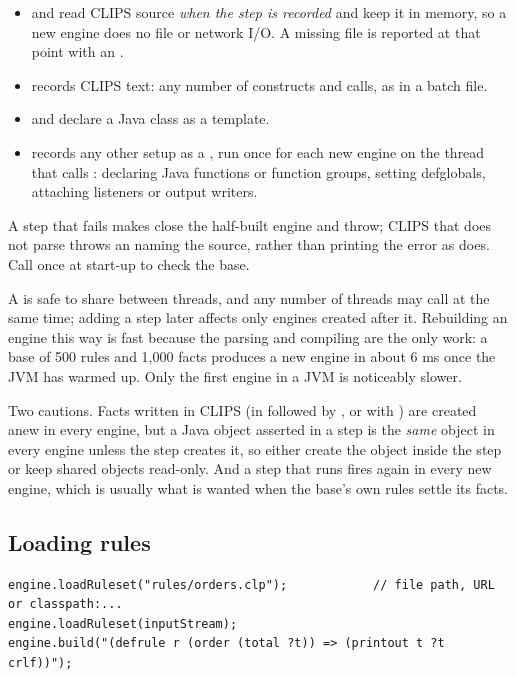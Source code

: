 \begin{itemize}
\item {} and  read CLIPS source
  \emph{when the step is recorded} and keep it in memory, so a new
  engine does no file or network I/O. A missing file is reported at that
  point with an .
\item {} records CLIPS text: any number of constructs and
  calls, as in a batch file.
\item {} and 
  declare a Java class as a template.
\item {} records any other setup as a
  , run once for each new engine on the thread that
  calls : declaring Java functions or function groups,
  setting defglobals, attaching listeners or output writers.
\end{itemize}

A step that fails makes  close the half-built engine
and throw; CLIPS that does not parse throws an
 naming the source, rather than printing
the error as  does. Call  once at start-up to
check the base.

A  is safe to share between threads, and any number of
threads may call  at the same time; adding a step later
affects only engines created after it. Rebuilding an engine this way is
fast because the parsing and compiling are the only work: a base of 500
rules and 1{,}000 facts produces a new engine in about 6 ms once the JVM
has warmed up. Only the first engine in a JVM is noticeably slower.

Two cautions. Facts written in CLIPS (in  followed by
, or with ) are created anew in every engine, but
a Java object asserted in a  step is the \emph{same}
object in every engine unless the step creates it, so either create the
object inside the step or keep shared objects read-only. And a step that
runs  fires again in every new engine, which is usually what
is wanted when the base's own rules settle its facts.

\subsection{Loading rules}

\begin{lstlisting}[style=java]
engine.loadRuleset("rules/orders.clp");            // file path, URL or classpath:...
engine.loadRuleset(inputStream);
engine.build("(defrule r (order (total ?t)) => (printout t ?t crlf))");
\end{lstlisting}

